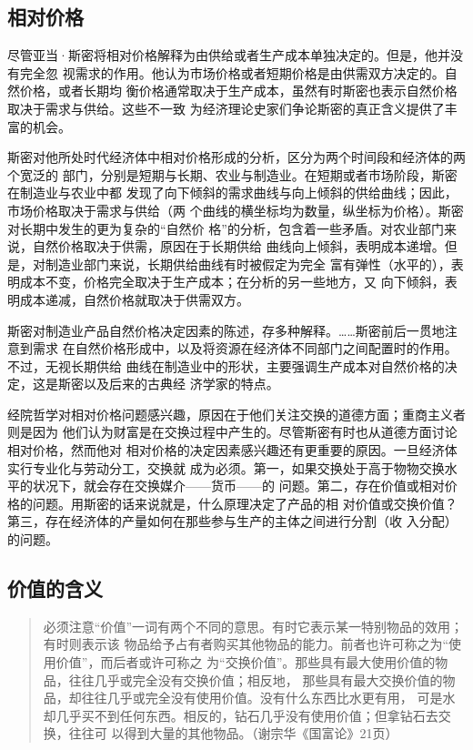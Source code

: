\subsection{相对价格}

尽管亚当·斯密将相对价格解释为由供给或者生产成本单独决定的。但是，他并没有完全忽
视需求的作用。他认为市场价格或者短期价格是由供需双方决定的。自然价格，或者长期均
衡价格通常取决于生产成本，虽然有时斯密也表示自然价格取决于需求与供给。这些不一致
为经济理论史家们争论斯密的真正含义提供了丰富的机会。

斯密对他所处时代经济体中相对价格形成的分析，区分为两个时间段和经济体的两个宽泛的
部门，分别是短期与长期、农业与制造业。在短期或者市场阶段，斯密在制造业与农业中都
发现了向下倾斜的需求曲线与向上倾斜的供给曲线；因此，市场价格取决于需求与供给（两
个曲线的横坐标均为数量，纵坐标为价格）。斯密对长期中发生的更为复杂的“自然价
格”的分析，包含着一些矛盾。对农业部门来说，自然价格取决于供需，原因在于长期供给
曲线向上倾斜，表明成本递增。但是，对制造业部门来说，长期供给曲线有时被假定为完全
富有弹性（水平的），表明成本不变，价格完全取决于生产成本；在分析的另一些地方，又
向下倾斜，表明成本递减，自然价格就取决于供需双方。

斯密对制造业产品自然价格决定因素的陈述，存多种解释。……斯密前后一贯地注意到需求
在自然价格形成中，以及将资源在经济体不同部门之间配置时的作用。不过，无视长期供给
曲线在制造业中的形状，主要强调生产成本对自然价格的决定，这是斯密以及后来的古典经
济学家的特点。

经院哲学对相对价格问题感兴趣，原因在于他们关注交换的道德方面；重商主义者则是因为
他们认为财富是在交换过程中产生的。尽管斯密有时也从道德方面讨论相对价格，然而他对
相对价格的决定因素感兴趣还有更重要的原因。一旦经济体实行专业化与劳动分工，交换就
成为必须。第一，如果交换处于高于物物交换水平的状况下，就会存在交换媒介——货币——的
问题。第二，存在价值或相对价格的问题。用斯密的话来说就是，什么原理决定了产品的相
对价值或交换价值？第三，存在经济体的产量如何在那些参与生产的主体之间进行分割（收
入分配）的问题。

\subsection{价值的含义}

\begin{quotation}
必须注意“价值”一词有两个不同的意思。有时它表示某一特别物品的效用；有时则表示该
物品给予占有者购买其他物品的能力。前者也许可称之为“使用价值”，而后者或许可称之
为“交换价值”。那些具有最大使用价值的物品，往往几乎或完全没有交换价值；相反地，
那些具有最大交换价值的物品，却往往几乎或完全没有使用价值。没有什么东西比水更有用，
可是水却几乎买不到任何东西。相反的，钻石几乎没有使用价值；但拿钻石去交换，往往可
以得到大量的其他物品。（谢宗华《国富论》21页）
\end{quotation}


